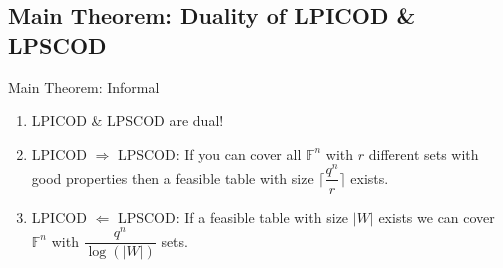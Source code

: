 \documentclass[xcolor=dvipsnames, aspectratio=169]{beamer}
\begin{document}
\subsection{Main Theorem: Duality of LPICOD \& LPSCOD}
\begin{frame}{Main Theorem: Informal}
	\begin{theorem}
		\begin{enumerate}
			\item <1->[]LPICOD \& LPSCOD are dual!
			\item<2->[]
			LPICOD $\Rightarrow$ LPSCOD: If you can cover all $\mathbb{F}^n$ with $r$ different sets with good properties then a feasible table with size $\lceil \dfrac{q^n}{r}\rceil $ exists.
			\item<3->[]
			LPICOD $\Leftarrow$ LPSCOD:	If a feasible table with size $|W|$ exists we can cover $\mathbb{F}^n$ with $\dfrac{q^n}{\log(|W|)}$ sets.
		\end{enumerate}
	\end{theorem}
\end{frame}
\end{document}
